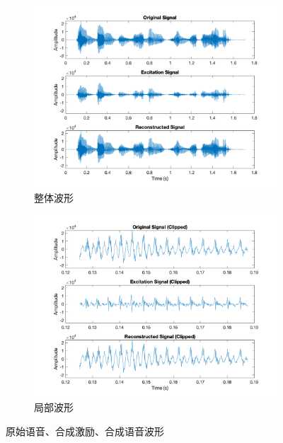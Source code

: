 \documentclass[a4paper]{article}  %
\begin{document}
\begin{figure}[ht]
    \centering
    \begin{subfigure}[b]{0.48\textwidth}
        \centering
        \includegraphics[width=\textwidth]{asserts/1_6_signal_t.png}
        \caption{
            整体波形
        }\label{fig:1_6_signal_t}
    \end{subfigure}
    \hfill
    \begin{subfigure}[b]{0.48\textwidth}
        \centering
        \includegraphics[width=\textwidth]{asserts/1_6_clipped_signal_t.png}
        \caption{
            局部波形
        }\label{fig:1_6_clipped_signal_t}
    \end{subfigure}
    \caption{
        原始语音、合成激励、合成语音波形
    }
\end{figure}
\end{document}
